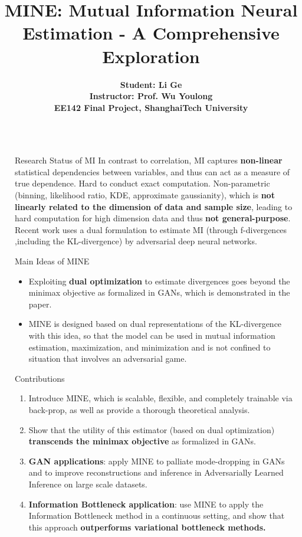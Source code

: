 \documentclass[final]{beamer}
\title{MINE: Mutual Information Neural Estimation - A Comprehensive Exploration}
\author{
        \textbf{Student: Li Ge}\\
        \textbf{Instructor: Prof. Wu Youlong}\\
        \textbf{EE142 Final Project, ShanghaiTech University}}
\newlength{\sepwidth}
\newlength{\colwidth}
\newcommand{\separatorcolumn}{\begin{column}{\sepwidth}\end{column}}
\begin{document}
\begin{frame}[t]
\begin{columns}[t]
\separatorcolumn

\begin{column}{\colwidth}

\begin{block}{Research Status of MI}
        In contrast to correlation, MI captures \textbf{non-linear} statistical dependencies between variables, and thus can act as a measure of true dependence. 
        Hard to conduct exact computation.
        Non-parametric (binning, likelihood ratio, KDE, approximate gaussianity), which is \textbf{not linearly related to the dimension of data and sample size}, leading to hard computation for high dimension data and thus \textbf{not general-purpose}. Recent work uses a dual formulation to estimate MI (through f-divergences ,including the KL-divergence) by adversarial deep neural networks. 

\end{block}

\begin{block}{Main Ideas of MINE}

    \begin{itemize}
      \item Exploiting \textbf{dual optimization} to estimate divergences goes beyond the minimax objective as formalized in GANs, which is demonstrated in the paper.
      \item MINE is designed based on dual representations of the KL-divergence with this idea, so that the model can be used in mutual information estimation, maximization, and minimization and is not confined to situation that involves an adversarial game.

    \end{itemize}

\end{block}

\begin{block}{Contributions}

    \begin{enumerate}
      \item Introduce MINE, which is scalable, flexible, and completely trainable via back-prop, as well as provide a thorough theoretical analysis.
      \item Show that the utility of this estimator (based on dual optimization) \textbf{transcends the minimax objective} as formalized in GANs.
      \item \textbf{GAN applications}: apply MINE to palliate mode-dropping in GANs and to improve reconstructions and inference in Adversarially Learned Inference on large scale datasets.
      \item \textbf{Information Bottleneck application}: use MINE to apply the Information Bottleneck method in a continuous setting, and show that this approach \textbf{outperforms variational bottleneck methods.}


\end{enumerate}
\end{block}
\end{column}
\end{columns}
\end{frame}
\end{document}
